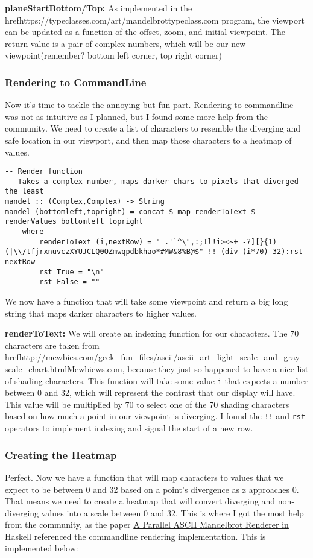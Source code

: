 \documentclass{article}
\begin{document}
    \medskip\noindent
    \textbf{planeStartBottom/Top:} As implemented in the href{https://typeclasses.com/art/mandelbrot}{typeclass.com} program, the viewport can be updated as a function of the offset, zoom, and initial viewpoint. The return value is a pair of complex numbers, which will be our new viewpoint(remember? bottom left corner, top right corner)
    
    \subsubsection{Rendering to CommandLine}
    Now it's time to tackle the annoying but fun part. Rendering to commandline was not as intuitive as I planned, but I found some more help from the community. We need to create a list of characters to resemble the diverging and safe location in our viewport, and then map those characters to a heatmap of values. 
    
    \begin{lstlisting}
-- Render function
-- Takes a complex number, maps darker chars to pixels that diverged the least
mandel :: (Complex,Complex) -> String
mandel (bottomleft,topright) = concat $ map renderToText $ renderValues bottomleft topright
    where
        renderToText (i,nextRow) = " .'`^\",:;Il!i><~+_-?][}{1)(|\\/tfjrxnuvczXYUJCLQ0OZmwqpdbkhao*#MW&8%B@$" !! (div (i*70) 32):rst nextRow
        rst True = "\n"
        rst False = ""
    \end{lstlisting}
    
    \medskip\noindent
    We now have a function that will take some viewpoint and return a big long string that maps darker characters to higher values.
    
    \smallskip\noident
    \textbf{renderToText:} We will create an indexing function for our characters. The 70 characters are taken from href{http://mewbies.com/geek_fun_files/ascii/ascii_art_light_scale_and_gray_scale_chart.html}{Mewbiews.com}, because they just so happened to have a nice list of shading characters. This function will take some value \lstinline{i} that expects a number between 0 and 32, which will represent the contrast that our display will have. This value will be multiplied by 70 to select one of the 70 shading characters based on how much a point in our viewpoint is diverging. I found the \lstinline{!!} and \lstinline{rst} operators to implement indexing and signal the start of a new row.
    
    \subsubsection{Creating the Heatmap}
    Perfect. Now we have a function that will map characters to values that we expect to be between 0 and 32 based on a point's divergence as z approaches 0. That means we need to create a heatmap that will convert diverging and non-diverging values into a scale between 0 and 32. This is where I got the most help from the community, as the paper \href{http://www.cs.columbia.edu/~sedwards/classes/2019/4995-fall/reports/mandelbrot.pdf}{A Parallel ASCII Mandelbrot Renderer in Haskell} referenced the commandline rendering implementation. This is implemented below:
    
\end{document}
